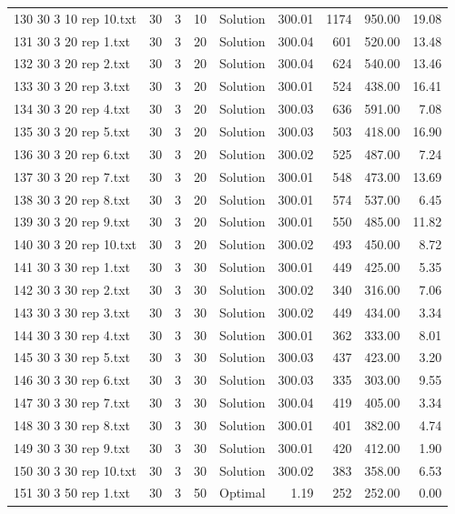 \begin{longtable}{lrrllrrrr}
130 30 3 10 rep 10.txt & 30 & 3 & 10 & Solution & 300.01 & 1174 & 950.00 & 19.08\\
131 30 3 20 rep 1.txt & 30 & 3 & 20 & Solution & 300.04 & 601 & 520.00 & 13.48\\
132 30 3 20 rep 2.txt & 30 & 3 & 20 & Solution & 300.04 & 624 & 540.00 & 13.46\\
133 30 3 20 rep 3.txt & 30 & 3 & 20 & Solution & 300.01 & 524 & 438.00 & 16.41\\
134 30 3 20 rep 4.txt & 30 & 3 & 20 & Solution & 300.03 & 636 & 591.00 &  7.08\\
135 30 3 20 rep 5.txt & 30 & 3 & 20 & Solution & 300.03 & 503 & 418.00 & 16.90\\
136 30 3 20 rep 6.txt & 30 & 3 & 20 & Solution & 300.02 & 525 & 487.00 &  7.24\\
137 30 3 20 rep 7.txt & 30 & 3 & 20 & Solution & 300.01 & 548 & 473.00 & 13.69\\
138 30 3 20 rep 8.txt & 30 & 3 & 20 & Solution & 300.01 & 574 & 537.00 &  6.45\\
139 30 3 20 rep 9.txt & 30 & 3 & 20 & Solution & 300.01 & 550 & 485.00 & 11.82\\
140 30 3 20 rep 10.txt & 30 & 3 & 20 & Solution & 300.02 & 493 & 450.00 &  8.72\\
141 30 3 30 rep 1.txt & 30 & 3 & 30 & Solution & 300.01 & 449 & 425.00 &  5.35\\
142 30 3 30 rep 2.txt & 30 & 3 & 30 & Solution & 300.02 & 340 & 316.00 &  7.06\\
143 30 3 30 rep 3.txt & 30 & 3 & 30 & Solution & 300.02 & 449 & 434.00 &  3.34\\
144 30 3 30 rep 4.txt & 30 & 3 & 30 & Solution & 300.01 & 362 & 333.00 &  8.01\\
145 30 3 30 rep 5.txt & 30 & 3 & 30 & Solution & 300.03 & 437 & 423.00 &  3.20\\
146 30 3 30 rep 6.txt & 30 & 3 & 30 & Solution & 300.03 & 335 & 303.00 &  9.55\\
147 30 3 30 rep 7.txt & 30 & 3 & 30 & Solution & 300.04 & 419 & 405.00 &  3.34\\
148 30 3 30 rep 8.txt & 30 & 3 & 30 & Solution & 300.01 & 401 & 382.00 &  4.74\\
149 30 3 30 rep 9.txt & 30 & 3 & 30 & Solution & 300.01 & 420 & 412.00 &  1.90\\
150 30 3 30 rep 10.txt & 30 & 3 & 30 & Solution & 300.02 & 383 & 358.00 &  6.53\\
151 30 3 50 rep 1.txt & 30 & 3 & 50 & Optimal &  1.19 & 252 & 252.00 &  0.00\\

\end{longtable}
